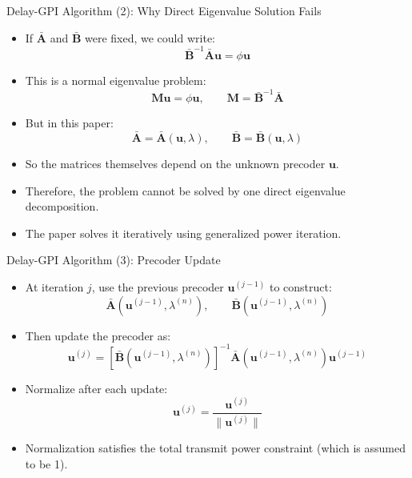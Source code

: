 \documentclass{beamer}
\begin{document}
\begin{frame}{Delay-GPI Algorithm (2): Why Direct Eigenvalue Solution Fails}
\small

\begin{itemize}
    \item If $\bar{\mathbf{A}}$ and $\bar{\mathbf{B}}$ were fixed, we could write:
    \[
        \bar{\mathbf{B}}^{-1}\bar{\mathbf{A}}\mathbf{u}
        =
        \phi \mathbf{u}
    \]

    \item This is a normal eigenvalue problem:
    \[
        \mathbf{M}\mathbf{u}
        =
        \phi \mathbf{u},
        \qquad
        \mathbf{M}
        =
        \bar{\mathbf{B}}^{-1}\bar{\mathbf{A}}
    \]

    \item But in this paper:
    \[
        \bar{\mathbf{A}}=\bar{\mathbf{A}}(\mathbf{u},\lambda),
        \qquad
        \bar{\mathbf{B}}=\bar{\mathbf{B}}(\mathbf{u},\lambda)
    \]

    \item So the matrices themselves depend on the unknown precoder $\mathbf{u}$.

    \item Therefore, the problem cannot be solved by one direct eigenvalue decomposition.

    \item The paper solves it iteratively using generalized power iteration.
\end{itemize}

\end{frame}

\begin{frame}{Delay-GPI Algorithm (3): Precoder Update}
\small

\begin{itemize}
    \item At iteration $j$, use the previous precoder $\mathbf{u}^{(j-1)}$ to construct:
    \[
        \bar{\mathbf{A}}
        \left(
        \mathbf{u}^{(j-1)},\lambda^{(n)}
        \right),
        \qquad
        \bar{\mathbf{B}}
        \left(
        \mathbf{u}^{(j-1)},\lambda^{(n)}
        \right)
    \]

    \item Then update the precoder as:
    \[
        \mathbf{u}^{(j)}
        =
        \left[
        \bar{\mathbf{B}}
        \left(
        \mathbf{u}^{(j-1)},\lambda^{(n)}
        \right)
        \right]^{-1}
        \bar{\mathbf{A}}
        \left(
        \mathbf{u}^{(j-1)},\lambda^{(n)}
        \right)
        \mathbf{u}^{(j-1)}
    \]

    \item Normalize after each update:
    \[
        \mathbf{u}^{(j)}
        =
        \frac{\mathbf{u}^{(j)}}{\|\mathbf{u}^{(j)}\|}
    \]

    \item Normalization satisfies the total transmit power constraint (which is assumed to be 1).
\end{itemize}

\end{frame}
\end{document}
